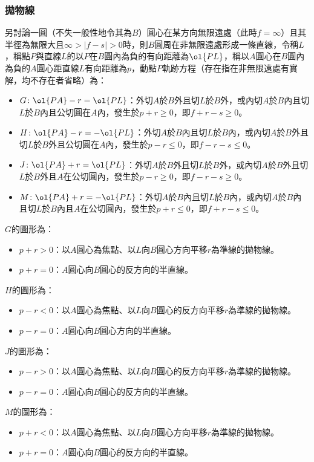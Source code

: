 \documentclass[a4paper,12pt]{report}
\begin{document}
\subsubsection{拋物線}
另討論一圓（不失一般性地令其為$B$）圓心在某方向無限遠處（此時$f=\infty$）且其半徑為無限大且$\infty>|f-s|>0$時，則$B$圓周在非無限遠處形成一條直線，令稱$L$，稱點$P$與直線$L$的以$P$在$B$圓內為負的有向距離為$\ol{PL}$，稱以$A$圓心在$B$圓內為負的$A$圓心距直線$L$有向距離為$p$，動點$P$軌跡方程（存在指在非無限遠處有實解，均不存在者省略）為：
\begin{itemize}
\item $G\colon\ol{PA}-r=\ol{PL}$：外切$A$於$B$外且切$L$於$B$外，或內切$A$於$B$內且切$L$於$B$內且公切圓在$A$內，發生於$p+r\geq 0$，即$f+r-s\geq 0$。
\item $H\colon\ol{PA}-r=-\ol{PL}$：外切$A$於$B$內且切$L$於$B$內，或內切$A$於$B$外且切$L$於$B$外且公切圓在$A$內，發生於$p-r\leq 0$，即$f-r-s\leq 0$。
\item $J\colon\ol{PA}+r=\ol{PL}$：外切$A$於$B$外且切$L$於$B$外，或內切$A$於$B$外且切$L$於$B$外且$A$在公切圓內，發生於$p-r\geq 0$，即$f-r-s\geq 0$。
\item $M\colon\ol{PA}+r=-\ol{PL}$：外切$A$於$B$內且切$L$於$B$內，或內切$A$於$B$內且切$L$於$B$內且$A$在公切圓內，發生於$p+r\leq 0$，即$f+r-s\leq 0$。
\end{itemize}
$G$的圖形為：
\begin{itemize}
\item $p+r>0$：以$A$圓心為焦點、以$L$向$B$圓心方向平移$r$為準線的拋物線。
\item $p+r=0$：$A$圓心向$B$圓心的反方向的半直線。
\end{itemize}
$H$的圖形為：
\begin{itemize}
\item $p-r<0$：以$A$圓心為焦點、以$L$向$B$圓心的反方向平移$r$為準線的拋物線。
\item $p-r=0$：$A$圓心向$B$圓心方向的半直線。
\end{itemize}
$J$的圖形為：
\begin{itemize}
\item $p-r>0$：以$A$圓心為焦點、以$L$向$B$圓心的反方向平移$r$為準線的拋物線。
\item $p-r=0$：$A$圓心向$B$圓心的反方向的半直線。
\end{itemize}
$M$的圖形為：
\begin{itemize}
\item $p+r<0$：以$A$圓心為焦點、以$L$向$B$圓心方向平移$r$為準線的拋物線。
\item $p+r=0$：$A$圓心向$B$圓心的反方向的半直線。
\end{itemize}
\end{document}
